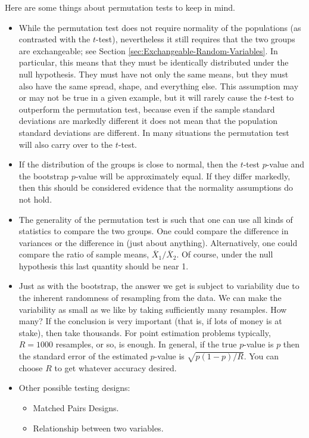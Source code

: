 \documentclass[captions=tableheading]{scrbook}
\begin{document}
\begin{rem}
Here are some things about permutation tests to keep in mind.
\begin{itemize}
\item While the permutation test does not require normality of the populations (as contrasted with the \(t\)-test), nevertheless it still requires that the two groups are exchangeable; see Section \ref{sec:Exchangeable-Random-Variables}. In particular, this means that they must be identically distributed under the null hypothesis. They must have not only the same means, but they must also have the same spread, shape, and everything else. This assumption may or may not be true in a given example, but it will rarely cause the \(t\)-test to outperform the permutation test, because even if the sample standard deviations are markedly different it does not mean that the population standard deviations are different. In many situations the permutation test will also carry over to the \(t\)-test.
\item If the distribution of the groups is close to normal, then the \(t\)-test \(p\)-value and the bootstrap \(p\)-value will be approximately equal. If they differ markedly, then this should be considered evidence that the normality assumptions do not hold.
\item The generality of the permutation test is such that one can use all kinds of statistics to compare the two groups. One could compare the difference in variances or the difference in (just about anything). Alternatively, one could compare the ratio of sample means, \(\overline{X}_{1}/\overline{X}_{2}\). Of course, under the null hypothesis this last quantity should be near 1.
\item Just as with the bootstrap, the answer we get is subject to variability due to the inherent randomness of resampling from the data. We can make the variability as small as we like by taking sufficiently many resamples. How many? If the conclusion is very important (that is, if lots of money is at stake), then take thousands. For point estimation problems typically, \(R=1000\) resamples, or so, is enough. In general, if the true \(p\)-value is \(p\) then the standard error of the estimated \(p\)-value is \(\sqrt{p(1-p)/R}\). You can choose \(R\) to get whatever accuracy desired.
\end{itemize}
\end{rem}

\begin{itemize}
\item Other possible testing designs:
\begin{itemize}
\item Matched Pairs Designs.
\item Relationship between two variables.
\end{itemize}
\end{itemize}
\end{document}
